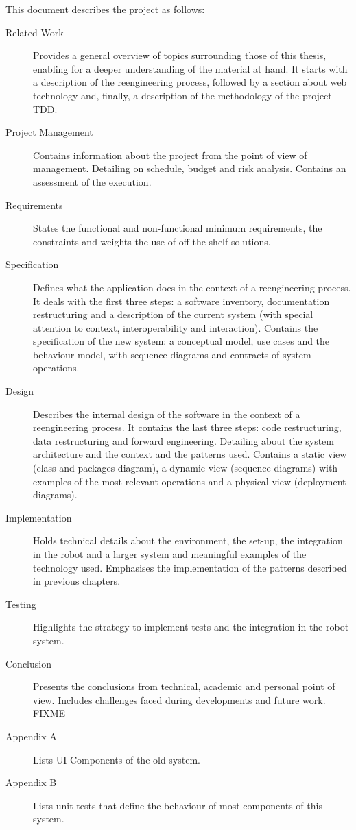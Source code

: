 This document describes the project as follows:
\begin{description}
\item[Related Work] Provides a general overview of topics surrounding those of this thesis, enabling for a deeper understanding of the material at hand.
It starts with a description of the reengineering process, followed by a section about web technology and, finally, a description of the methodology of the project -- \ac{TDD}.

\item[Project Management] Contains information about the project from the point of view of management. 
Detailing on schedule, budget and risk analysis. Contains an assessment of the execution.

\item[Requirements] States the functional and non-functional minimum requirements, the constraints and weights the use of off-the-shelf solutions.

\item[Specification] Defines what the application does in the context of a reengineering process. 
It deals with the first three steps: a software inventory, documentation restructuring and a description of the current system (with special attention to context, interoperability and interaction).
Contains the specification of the new system: a conceptual model, use cases and the behaviour model, with sequence diagrams and contracts of system operations. 

\item[Design] Describes the internal design of the software in the context of a reengineering process. 
It contains the last three steps: code restructuring, data restructuring and forward engineering.
Detailing about the system architecture and the context and the patterns used.
Contains a static view (class and packages diagram), a dynamic view (sequence diagrams) with examples of the most relevant operations and a physical view (deployment diagrams).

\item[Implementation] Holds technical details about the environment, the set-up, the integration in the robot and a larger system and meaningful examples of the technology used. 
Emphasises the implementation of the patterns described in previous chapters.

\item[Testing] Highlights the strategy to implement tests and the integration in the robot system.

\item[Conclusion] Presents the conclusions from technical, academic and personal point of view. 
Includes challenges faced during developments and future work. FIXME

\item[Appendix A] Lists UI Components of the old system.

\item[Appendix B] Lists unit tests that define the behaviour of most components of this system.

\end{description}